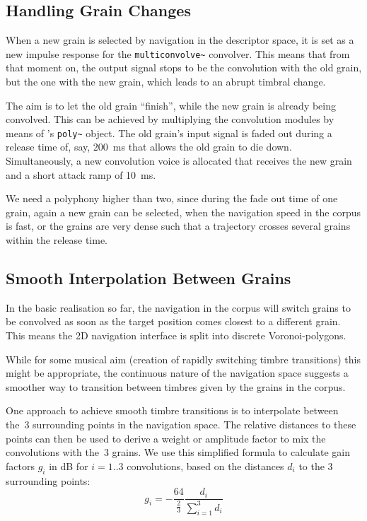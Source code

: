 \subsection{Handling Grain Changes}\label{sec:set}

When a new grain is selected by navigation in the descriptor space, it is set as a new impulse response for the \verb|multiconvolve~| convolver.  This means that from that moment on, the output signal stops to be the convolution with the old grain, but the one with the new grain, which leads to an abrupt timbral change.

The aim is to let the old grain ``finish'', while the new grain is already being convolved.  This can be achieved by multiplying the convolution modules by means of \maxmsp's \verb|poly~| object.  The old grain's input signal is faded out during a release time of, say, 200~ms that allows the old grain to die down.  Simultaneously, a new convolution voice is allocated that receives the new grain and a short attack ramp of 10~ms.

We need a polyphony higher than two, since during the fade out time of one grain, again a new grain can be selected, when the navigation speed in the corpus is fast, or the grains are very dense such that a trajectory crosses several grains within the release time.


\subsection{Smooth Interpolation Between Grains}\label{sec:mix}


In the basic realisation so far, the navigation in the corpus will switch grains to be convolved as soon as the target position comes closest to a different grain.  
This means the 2D navigation interface is split into discrete Voronoi-polygons.

While for some musical aim (creation of rapidly switching timbre transitions) this might be appropriate, the continuous nature of the navigation space suggests a smoother way to transition between timbres given by the grains in the corpus.

One approach to achieve smooth timbre transitions is to interpolate between the~3 surrounding points in the navigation space.  The relative distances to these points can then be used to derive a weight or amplitude factor \cite{FreedMacCallumSchmederWessel-nime2010-hybridization-interfaces} to mix the convolutions with the~3 grains.  We use this simplified formula to calculate gain factors $g_i$ in dB for $i = 1..3$ convolutions, based on the distances $d_i$ to the 3 surrounding points:
%
\begin{equation}
  g_i = -\frac{64}{\frac{2}{3}} \frac{d_i}{\sum_{i=1}^3 d_i}
\end{equation}

